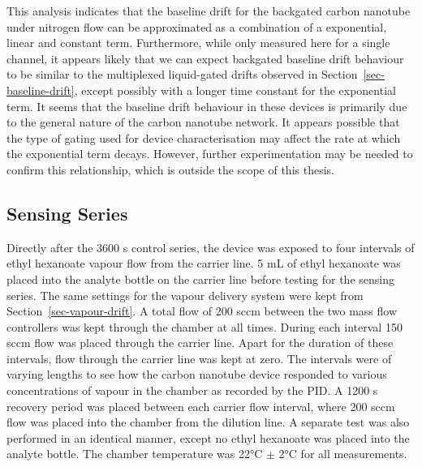 \documentclass[
  a4paper,
]{scrbook}
\begin{document}
This analysis indicates that the baseline drift for the backgated carbon
nanotube under nitrogen flow can be approximated as a combination of a
exponential, linear and constant term. Furthermore, while only measured
here for a single channel, it appears likely that we can expect
backgated baseline drift behaviour to be similar to the multiplexed
liquid-gated drifts observed in Section~\ref{sec-baseline-drift}, except
possibly with a longer time constant for the exponential term. It seems
that the baseline drift behaviour in these devices is primarily due to
the general nature of the carbon nanotube network. It appears possible
that the type of gating used for device characterisation may affect the
rate at which the exponential term decays. However, further
experimentation may be needed to confirm this relationship, which is
outside the scope of this thesis.

\hypertarget{sec-EtHex-series}{%
\subsection{Sensing Series}\label{sec-EtHex-series}}

Directly after the 3600 s control series, the device was exposed to four
intervals of ethyl hexanoate vapour flow from the carrier line. 5 mL of
ethyl hexanoate was placed into the analyte bottle on the carrier line
before testing for the sensing series. The same settings for the vapour
delivery system were kept from Section~\ref{sec-vapour-drift}. A total
flow of 200 sccm between the two mass flow controllers was kept through
the chamber at all times. During each interval 150 sccm flow was placed
through the carrier line. Apart for the duration of these intervals,
flow through the carrier line was kept at zero. The intervals were of
varying lengths to see how the carbon nanotube device responded to
various concentrations of vapour in the chamber as recorded by the PID.
A 1200 s recovery period was placed between each carrier flow interval,
where 200 sccm flow was placed into the chamber from the dilution line.
A separate test was also performed in an identical manner, except no
ethyl hexanoate was placed into the analyte bottle. The chamber
temperature was 22°C \(\pm\) 2°C for all measurements.
\end{document}
